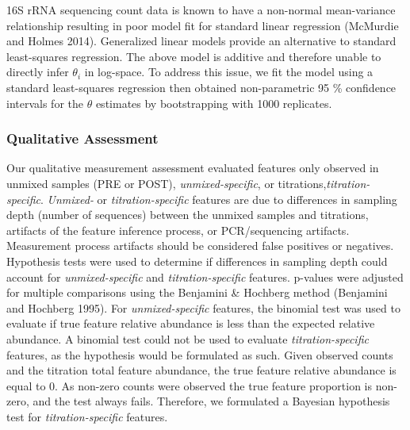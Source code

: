 \documentclass[smallextended]{svjour3}       %
\begin{document}
16S rRNA sequencing count data is known to have a non-normal
mean-variance relationship resulting in poor model fit for standard
linear regression (McMurdie and Holmes 2014). Generalized linear models
provide an alternative to standard least-squares regression. The above
model is additive and therefore unable to directly infer \(\theta_i\) in
log-space. To address this issue, we fit the model using a standard
least-squares regression then obtained non-parametric 95 \% confidence
intervals for the \(\theta\) estimates by bootstrapping with 1000
replicates.

\hypertarget{qualitative-assessment}{%
\subsubsection{Qualitative Assessment}\label{qualitative-assessment}}

Our qualitative measurement assessment evaluated features only observed
in unmixed samples (PRE or POST), \emph{unmixed-specific}, or
titrations,\emph{titration-specific}. \emph{Unmixed-} or
\emph{titration-specific} features are due to differences in sampling
depth (number of sequences) between the unmixed samples and titrations,
artifacts of the feature inference process, or PCR/sequencing artifacts.
Measurement process artifacts should be considered false positives or
negatives. Hypothesis tests were used to determine if differences in
sampling depth could account for \emph{unmixed-specific} and
\emph{titration-specific} features. p-values were adjusted for multiple
comparisons using the Benjamini \& Hochberg method (Benjamini and
Hochberg 1995). For \emph{unmixed-specific} features, the binomial test
was used to evaluate if true feature relative abundance is less than the
expected relative abundance. A binomial test could not be used to
evaluate \emph{titration-specific} features, as the hypothesis would be
formulated as such. Given observed counts and the titration total
feature abundance, the true feature relative abundance is equal to 0. As
non-zero counts were observed the true feature proportion is non-zero,
and the test always fails. Therefore, we formulated a Bayesian
hypothesis test for \emph{titration-specific} features.
\end{document}
